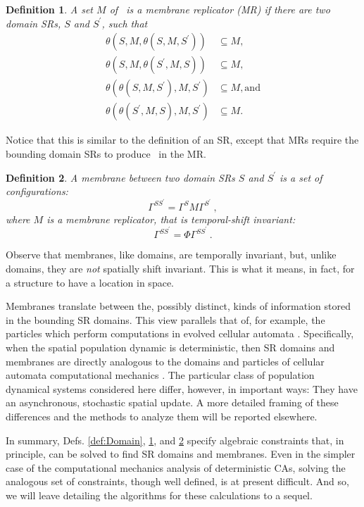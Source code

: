 \documentclass[pre,twocolumn,showpacs,superscriptaddress,preprintnumbers,floatfix]{revtex4}
\theoremstyle{plain}    \newtheorem{Lem}{Lemma}
\theoremstyle{plain}    \newtheorem*{ProLem}{Proof}
\theoremstyle{plain}    \newtheorem{Cor}{Corollary}
\theoremstyle{plain}    \newtheorem*{ProCor}{Proof}
\theoremstyle{plain}    \newtheorem{The}{Theorem}
\theoremstyle{plain}    \newtheorem*{ProThe}{Proof}
\theoremstyle{plain}    \newtheorem{Prop}{Proposition}
\theoremstyle{plain}    \newtheorem*{ProProp}{Proof}
\theoremstyle{plain}    \newtheorem*{Conj}{Conjecture}
\theoremstyle{plain}    \newtheorem*{Rem}{Remark}
\theoremstyle{plain}    \newtheorem{Def}{Definition}
\theoremstyle{plain}    \newtheorem*{Not}{Notation}
\begin{document}
\begin{Def}
A set $M$ of \eMs\ is a \emph{membrane replicator} (MR) if 
there are two domain SRs, $S$ and $S^\prime$, such that
\begin{align*}
\theta(S,M,\theta(S,M,S^\prime)) & \subseteq M,\\
\theta(S,M,\theta(S^\prime,M,S)) & \subseteq M,\\
\theta(\theta(S,M,S^\prime),M,S^\prime) & \subseteq M, \mathrm{ and} \\
\theta(\theta(S^\prime,M,S),M,S^\prime) & \subseteq M.
\end{align*}
\label{def:MR}
\end{Def}

Notice that this is similar to the definition of an SR, except that MRs require
the bounding domain SRs to produce \eMs\ in the MR.

\begin{Def}
A \emph{membrane} between two domain SRs $S$ and $S^\prime$ is a
set of configurations:
\begin{equation}
\Gamma^{SS^\prime} = \Gamma^{S} M \Gamma^{S^\prime} ~,
\end{equation}
where $M$ is a membrane replicator, that is temporal-shift invariant:
\begin{equation}
\Gamma^{SS^\prime} = \Phi \Gamma^{SS^\prime} ~.
\end{equation}
\label{def:Membrane}
\end{Def}

Observe that membranes, like domains, are temporally invariant, but, unlike
domains, they are \emph{not} spatially shift invariant. This is what it means,
in fact, for a structure to have a location in space.

Membranes translate between the, possibly distinct, kinds of information stored
in the bounding SR domains. This view parallels that of, for example, the
particles which perform computations in evolved cellular automata
\cite{Crutchfield&Mitchell94a}. Specifically, when the spatial population
dynamic is deterministic, then SR domains and membranes are directly analogous
to the domains and particles of cellular automata computational mechanics
\cite{CACMechMerge}. The particular class of population dynamical
systems considered here differ, however, in important ways: They have an
asynchronous, stochastic spatial update. A more detailed framing of these
differences and the methods to analyze them will be reported elsewhere.

In summary, Defs. \ref{def:Domain}, \ref{def:MR}, and \ref{def:Membrane}
specify algebraic constraints that, in principle, can be solved to find SR
domains and membranes. Even in the simpler case of the computational mechanics
analysis of deterministic CAs, solving the analogous set of constraints,
though well defined, is at present difficult. And so, we will leave detailing
the algorithms for these calculations to a sequel.
\end{document}

